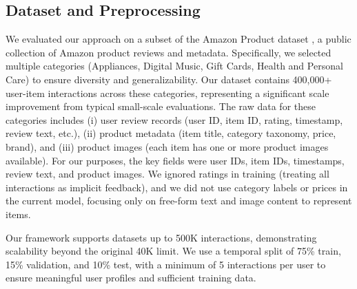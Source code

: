 \documentclass[conference]{IEEEtran}
\begin{document}
\subsection{Dataset and Preprocessing}
We evaluated our approach on a subset of the Amazon Product dataset \cite{b14}, a public collection of Amazon product reviews and metadata. Specifically, we selected multiple categories (Appliances, Digital Music, Gift Cards, Health and Personal Care) to ensure diversity and generalizability. Our dataset contains 400,000+ user-item interactions across these categories, representing a significant scale improvement from typical small-scale evaluations. The raw data for these categories includes (i) user review records (user ID, item ID, rating, timestamp, review text, etc.), (ii) product metadata (item title, category taxonomy, price, brand), and (iii) product images (each item has one or more product images available). For our purposes, the key fields were user IDs, item IDs, timestamps, review text, and product images. We ignored ratings in training (treating all interactions as implicit feedback), and we did not use category labels or prices in the current model, focusing only on free-form text and image content to represent items.

Our framework supports datasets up to 500K interactions, demonstrating scalability beyond the original 40K limit. We use a temporal split of 75\% train, 15\% validation, and 10\% test, with a minimum of 5 interactions per user to ensure meaningful user profiles and sufficient training data.


%
\end{document}
